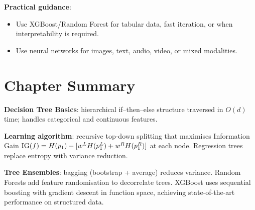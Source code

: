 \textbf{Practical guidance}:
\begin{itemize}
\item Use XGBoost/Random Forest for tabular data, fast iteration, or when
  interpretability is required.
\item Use neural networks for images, text, audio, video, or mixed modalities.
\end{itemize}

\section*{Chapter Summary}

\textbf{Decision Tree Basics}: hierarchical if--then--else structure traversed
in $O(d)$ time; handles categorical and continuous features.

\textbf{Learning algorithm}: recursive top-down splitting that maximises
Information Gain $\mathrm{IG}(f)=H(p_1)-[w^L H(p_1^L)+w^R H(p_1^R)]$ at each node.
Regression trees replace entropy with variance reduction.

\textbf{Tree Ensembles}: bagging (bootstrap + average) reduces variance.
Random Forests add feature randomisation to decorrelate trees. XGBoost uses
sequential boosting with gradient descent in function space, achieving
state-of-the-art performance on structured data.
